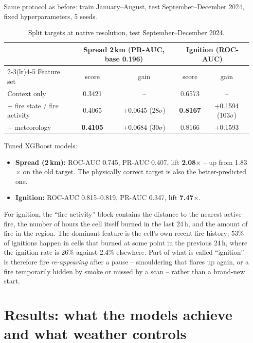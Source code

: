 \documentclass[11pt,a4paper,oneside]{report}
\newcommand{\sig}{\ensuremath{\sigma}}
\begin{document}
Same protocol as before: train January--August, test September--December 2024,
fixed hyperparameters, 5 seeds.

\begin{table}[H]
\centering\small
\caption[Spread and ignition models, holdout]{Split targets at native resolution,
test September--December 2024.}
\label{tab:split-results}
\begin{tabular}{lcccc}
\toprule
 & \multicolumn{2}{c}{Spread 2\,km (PR-AUC, base 0.196)} & \multicolumn{2}{c}{Ignition (ROC-AUC)} \\
\cmidrule(lr){2-3}\cmidrule(lr){4-5}
Feature set & score & gain & score & gain \\
\midrule
Context only & 0.3421 & -- & 0.6573 & -- \\
+ fire state / fire activity & 0.4065 & +0.0645 (28\sig) & \textbf{0.8167} & +0.1594 (103\sig) \\
+ meteorology & \textbf{0.4105} & +0.0684 (30\sig) & 0.8166 & +0.1593 \\
\bottomrule
\end{tabular}
\end{table}

Tuned XGBoost models:
\begin{itemize}
  \item \textbf{Spread (2\,km):} ROC-AUC 0.745, PR-AUC 0.407, lift
        \textbf{2.08$\times$} -- up from 1.83$\times$ on the old target. The
        physically correct target is also the better-predicted one.
  \item \textbf{Ignition:} ROC-AUC 0.815--0.819, PR-AUC 0.347, lift
        \textbf{7.47$\times$}.
\end{itemize}

For ignition, the \enquote{fire activity} block contains the distance to the
nearest active fire, the number of hours the cell itself burned in the last
24\,h, and the amount of fire in the region. The dominant feature is the
cell's own recent fire history: 53\% of ignitions happen in cells that burned at
some point in the previous 24\,h, where the ignition rate is 26\% against 2.4\%
elsewhere. Part of what is called \enquote{ignition} is therefore fire
\emph{re-appearing} after a pause -- smouldering that flares up again, or a fire
temporarily hidden by smoke or missed by a scan -- rather than a brand-new start.

\chapter{Results: what the models achieve and what weather controls}\label{ch:results}
\end{document}

